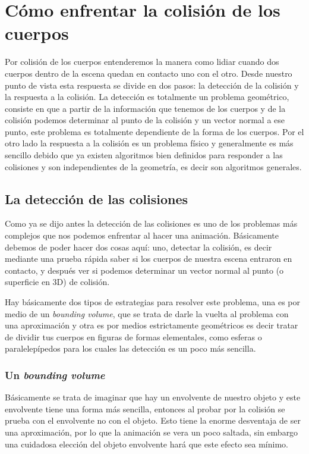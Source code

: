 \section{Cómo enfrentar la colisión de los cuerpos}
Por colisión de los cuerpos entenderemos la manera como lidiar cuando dos cuerpos dentro de la escena quedan en contacto uno con el otro. Desde nuestro punto de vista esta respuesta se divide en dos pasos: la detección de la colisión y la respuesta a la colisión.
La detección es totalmente un problema geométrico, consiste en que a partir de la información que tenemos de los cuerpos y de la colisión podemos determinar al punto de la colisión y un vector normal a ese punto, este problema es totalmente dependiente de la forma de los cuerpos. Por el otro lado la respuesta a la colisión es un problema físico y generalmente es más sencillo debido que ya existen algoritmos bien definidos para responder a las colisiones y son independientes de la geometría, es decir son algoritmos generales.

\subsection{La detección de las colisiones}
Como ya se dijo antes la detección de las colisiones es uno de los problemas más complejos que nos podemos enfrentar al hacer una animación. Básicamente debemos de poder hacer dos cosas aquí: uno, detectar la colisión, es decir mediante una prueba rápida saber si los cuerpos de nuestra escena entraron en contacto, y después ver si podemos determinar un vector normal al punto (o superficie en 3D) de colisión.

Hay básicamente dos tipos de estrategias para resolver este problema, una es por medio de un \foreignlanguage{english}{\emph{bounding volume}}, que se trata de darle la vuelta al problema con una aproximación y otra es por medios estrictamente geométricos es decir tratar de dividir tus cuerpos en figuras de formas elementales, como esferas o paralelepípedos para los cuales las detección es un poco más sencilla.

\subsubsection{Un \foreignlanguage{english}{\emph{bounding volume}}}
Básicamente se trata de imaginar que hay un envolvente de nuestro objeto y este envolvente tiene una forma más sencilla, entonces al probar por la colisión se prueba con el envolvente no con el objeto. Esto tiene la enorme desventaja de ser una aproximación, por lo que la animación se vera un poco saltada, sin embargo una cuidadosa elección del objeto envolvente hará que este efecto sea mínimo.

